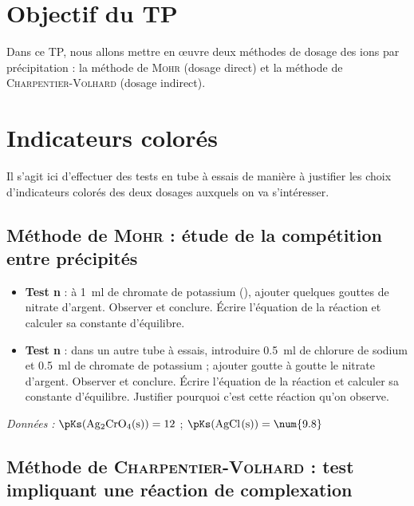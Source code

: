 \documentclass{tp}
\begin{document}


\section{Objectif du TP}
 Dans ce TP, nous allons mettre en œuvre deux méthodes de dosage des ions  par précipitation : la méthode de \textsc{Mohr} (dosage direct) et la méthode de \textsc{Charpentier-Volhard} (dosage indirect).

\section{Indicateurs colorés}%
\label{sec:indicateurs_colores}

Il s'agit ici d'effectuer des tests en tube à essais de manière à justifier les choix d'indicateurs colorés des deux dosages auxquels on va s'intéresser.

\subsection{Méthode de \textsc{Mohr} : étude de la compétition entre précipités}%
\label{sub:methode_de_mohr_etude_de_la_competition_entre_precipites}

\begin{itemize}
  \item \textbf{Test n} : à \SI{1}{\milli\litre} de chromate de potassium (), ajouter quelques gouttes de nitrate d'argent. Observer et conclure. Écrire l'équation de la réaction et calculer sa constante d'équilibre.

  \item \textbf{Test n} : dans un autre tube à essais, introduire \SI{0.5}{\milli\litre} de chlorure de sodium et \SI{0.5}{\milli\litre} de chromate de potassium ; ajouter goutte à goutte le nitrate d'argent. Observer et conclure. Écrire l'équation de la réaction et calculer sa constante d'équilibre. Justifier pourquoi c'est cette réaction qu'on observe.
\end{itemize}

\textit{Données : }$\pKs(\ce{Ag2CrO4(s)})=12$ ; $\pKs(\ce{AgCl(s)})=\num{9.8}$ 

\subsection{Méthode de \textsc{Charpentier-Volhard} : test impliquant une réaction de complexation}%
\label{sub:methode_de_charpentier_volhard_test}
\end{document}
